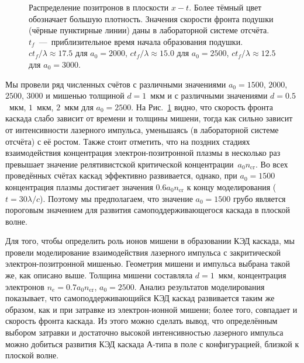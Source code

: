 \begin{figure}[h!]
    \caption[Распределение позитронов в плоскости $x-t$ в численных моделированиях с различными начальными параметрами]{
        \label{fig:ch2/cushion-x-t}
        Распределение позитронов в плоскости $x-t$. Более тёмный цвет обозначает большую плотность. Значения скорости фронта подушки (чёрные пунктирные линии) даны в лабораторной системе отсчёта. $t_{f}$~---~приблизительное время начала образования подушки. $ct_{f}/\lambda\approx17.5$ для $a_{0}=2000$, $ct_{f}/\lambda\approx15.0$ для $a_{0}=2500$, $ct_{f}/\lambda\approx12.5$ для $a_{0}=3000$.}
\end{figure}

Мы провели ряд численных счётов с различными значениями $a_{0}=1500$, $2000$, $2500$, $3000$ и мишенью толщиной $d=1$~мкм и с различными значениями $d=0.5$~мкм, $1$~мкм, $2$~мкм для $a_{0}=2500$. 
На Рис.~\ref{fig:ch2/cushion-x-t} видно, что скорость фронта каскада слабо зависит от времени и толщины мишени, тогда как сильно зависит от интенсивности лазерного импульса, уменьшаясь (в лабораторной системе отсчёта) с её ростом. 
Также стоит отметить, что на поздних стадиях взаимодействия концентрация электрон-позитронной плазмы в несколько раз превышает значение релятивистской критической концентрации~$a_0 n_\mathrm{cr}$. 
Во всех проведённых счётах каскад эффективно развивается, однако, при $a_0=1500$ концентрация плазмы достигает значения $0.6 a_0 n_\mathrm{cr}$ к концу моделирования ($t = 30 \lambda/c$).
Поэтому мы предполагаем, что значение $a_0=1500$ грубо является пороговым значением для развития самоподдерживающегося каскада в плоской волне.

Для того, чтобы определить роль ионов мишени в образовании КЭД каскада, мы провели моделирование взаимодействия лазерного импульса с закритической электрон-позитронной мишенью. 
Геометрия мишени и импульса выбрана такой же, как описано выше. 
Толщина мишени составляла $d=1$~мкм, концентрация электронов $n_e = 0.7 a_0 n_\mathrm{cr}$, $a_0=2500$. 
Анализ результатов моделирования показывает, что самоподдерживающийся КЭД каскад развивается таким же образом, как и при затравке из электрон-ионной мишени; более того, совпадает и скорость фронта каскада. 
Из этого можно сделать вывод, что определённым выбором затравки и достаточно высокой интенсивностью лазерного импульса можно добиться развития КЭД каскада А-типа в поле с конфигурацией, близкой к плоской волне.

